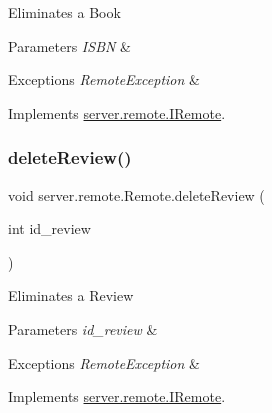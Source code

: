 Eliminates a Book 
\begin{DoxyParams}{Parameters}
{\em I\+S\+BN} & \\
\hline
\end{DoxyParams}

\begin{DoxyExceptions}{Exceptions}
{\em Remote\+Exception} & \\
\hline
\end{DoxyExceptions}


Implements \hyperlink{interfaceserver_1_1remote_1_1_i_remote_ac64967dff86a9c603d0c9eb815f222df}{server.\+remote.\+I\+Remote}.

\mbox{\label{classserver_1_1remote_1_1_remote_ab80b5addc446fe5f1ecf9a522794ff4f}} 
\subsubsection{\texorpdfstring{delete\+Review()}{deleteReview()}}
{\footnotesize\ttfamily void server.\+remote.\+Remote.\+delete\+Review (\begin{DoxyParamCaption}\item[{int}]{id\+\_\+review }\end{DoxyParamCaption})}

Eliminates a Review 
\begin{DoxyParams}{Parameters}
{\em id\+\_\+review} & \\
\hline
\end{DoxyParams}

\begin{DoxyExceptions}{Exceptions}
{\em Remote\+Exception} & \\
\hline
\end{DoxyExceptions}


Implements \hyperlink{interfaceserver_1_1remote_1_1_i_remote_a2bcc3db515d7b6f420449bcf6367298c}{server.\+remote.\+I\+Remote}.

\mbox{\label{classserver_1_1remote_1_1_remote_a22538e64b45f5f93237b455100243b44}} 
